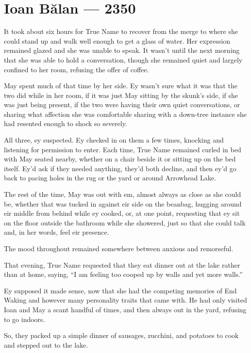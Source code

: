 \hypertarget{ioan-bux103lan-2350}{%
\chapter{Ioan Bălan — 2350}\label{ioan-bux103lan-2350}}

It took about six hours for True Name to recover from the merge to where she could stand up and walk well enough to get a glass of water. Her expression remained glazed and she was unable to speak. It wasn't until the next morning that she was able to hold a conversation, though she remained quiet and largely confined to her room, refusing the offer of coffee.

May spent much of that time by her side. Ey wasn't sure what it was that the two did while in her room, if it was just May sitting by the skunk's side, if she was just being present, if the two were having their own quiet conversations, or sharing what affection she was comfortable sharing with a down-tree instance she had resented enough to shock so severely.

All three, ey suspected. Ey checked in on them a few times, knocking and listening for permission to enter. Each time, True Name remained curled in bed with May seated nearby, whether on a chair beside it or sitting up on the bed itself. Ey'd ask if they needed anything, they'd both decline, and then ey'd go back to pacing holes in the rug or the yard or around Arrowhead Lake.

The rest of the time, May was out with em, almost always as close as she could be, whether that was tucked in against eir side on the beanbag, hugging around eir middle from behind while ey cooked, or, at one point, requesting that ey sit on the floor outside the bathroom while she showered, just so that she could talk and, in her words, feel eir presence.

The mood throughout remained somewhere between anxious and remorseful.

That evening, True Name requested that they eat dinner out at the lake rather than at home, saying, ``I am feeling too cooped up by walls and yet more walls.''

Ey supposed it made sense, now that she had the competing memories of End Waking and however many personality traits that came with. He had only visited Ioan and May a scant handful of times, and then always out in the yard, refusing to go indoors.

So, they packed up a simple dinner of sausages, zucchini, and potatoes to cook and stepped out to the lake.

